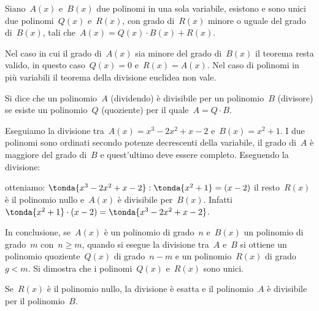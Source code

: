 \begin{teorema}
 Siano~\(A(x)\) e~\(B(x)\) due polinomi in una sola variabile, esistono e sono 
 unici due polinomi~\(Q(x)\) e~\(R(x)\), con grado di~\(R(x)\)
 minore o uguale del grado di~\(B(x)\), tali che~\(A(x)=Q(x)\cdot B(x)+R(x)\).
\end{teorema}

\osservazione Nel caso in cui il grado di~\(A(x)\) sia minore del grado 
di~\(B(x)\) il teorema resta valido, in questo caso~\(Q(x)=0\) e~\(R(x)=A(x)\).
Nel caso di polinomi in più variabili il teorema della divisione euclidea non 
vale.

\begin{definizione}
 Si dice che un polinomio~\(A\) (dividendo) è divisibile per un polinomio~\(B\) 
 (divisore) se esiste un polinomio~\(Q\) (quoziente) per il quale~\(A=Q\cdot 
B\).
\end{definizione}

 \begin{esempio}
 Eseguiamo la divisione tra~\(A(x)=x^{3}-2x^{2}+x-2\) e~\(B(x)=x^{2}+1\).
I due polinomi sono ordinati secondo potenze decrescenti della variabile, 
il grado di~\(A\) è maggiore del grado di~\(B\) e quest'ultimo
deve essere completo. 
Eseguendo la divisione: 
\begin{center}
\divdue
\end{center}
 \end{esempio}
otteniamo:
\(\tonda{x^{3}-2x^{2}+x-2}:\tonda{x^{2}+1}=(x-2)\) 
il resto~\(R(x)\) è il polinomio nullo e~\(A(x)\) è divisibile per~\(B(x)\).
Infatti~\(\tonda{x^{2}+1}\cdot (x-2)=\tonda{x^{3}-2x^{2}+x-2}\).

In conclusione, se~\(A(x)\) è un polinomio di grado~\(n\) e~\(B(x)\) un 
polinomio di grado~\(m\) con~\(n\ge m\), quando si esegue la divisione 
tra~\(A\) e~\(B\) si ottiene un polinomio quoziente~\(Q(x)\) di grado~\(n-m\) 
e un polinomio~\(R(x)\) di grado~\(g<m\).
Si dimostra che i polinomi~\(Q(x)\) e~\(R(x)\) sono unici.

Se~\(R(x)\) è il polinomio nullo, la divisione è esatta e il polinomio~\(A\) 
è divisibile per il polinomio~\(B\).


